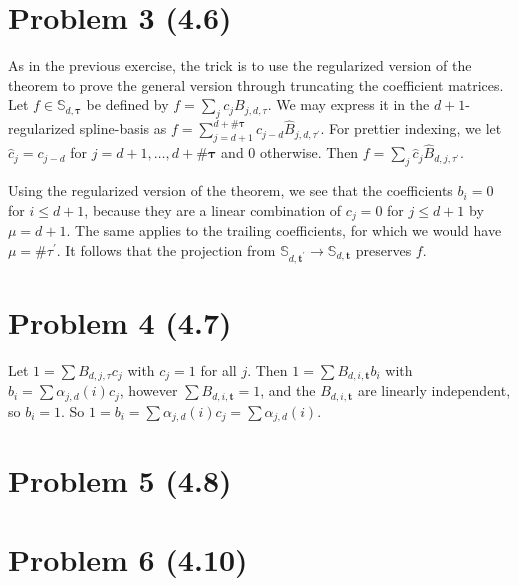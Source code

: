 \documentclass{article}
\begin{document}
\section*{Problem 3 (4.6)}

As in the previous exercise, the trick is to use the regularized version of the theorem to prove the general version
through truncating the coefficient matrices.
Let $f\in \mathbb S_{d,\mathbf \tau}$ be defined by $f=\sum_j c_j B_{j,d,\tau}$.
We may express it in the $d + 1$-regularized spline-basis as $f=\sum_{j=d + 1}^{d + \# \mathbf \tau} c_{j - d} \hat B_{j,d,\tau^\prime}$.
For prettier indexing, we let $\hat c_j=c_{j - d}$ for $j=d + 1,\ldots, d + \# \mathbf \tau$ and $0$ otherwise.
Then $f=\sum_j \hat c_j \hat B_{d,j,\tau^\prime}$.

Using the regularized version of the theorem, we see that the coefficients $b_i=0$ for $i\leq d + 1$,
because they are a linear combination of $c_j=0$ for $j\leq d + 1$ by $\mu=d + 1$.
The same applies to the trailing coefficients, for which we would have $\mu = \# \tau^\prime$.
It follows that the projection from $\mathbb S_{d,\mathbf t^\prime}\to \mathbb S_{d,\mathbf t}$ preserves $f$.


\section*{Problem 4 (4.7)}
Let $1 = \sum B_{d,j,\tau}c_j$ with $c_j=1$ for all $j$.
Then $1 = \sum B_{d,i,\mathbf t} b_i$ with $b_i=\sum \alpha_{j,d}(i) c_j$,
however $\sum B_{d,i,\mathbf t}=1$, and the $B_{d,i,\mathbf t}$ are linearly independent,
so $b_i = 1$.
So $1=b_i = \sum\alpha_{j,d}(i)c_j=\sum\alpha_{j,d}(i)$.

\section*{Problem 5 (4.8)}

\section*{Problem 6 (4.10)}
\end{document}
